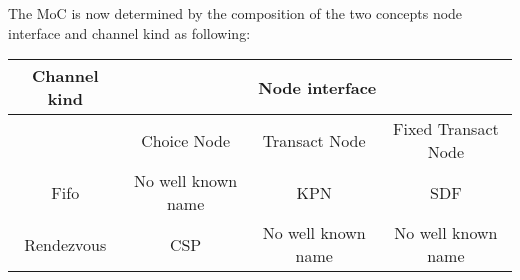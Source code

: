 The MoC is now determined by the composition of the two concepts node interface
and channel kind as following:

\begin{tabular}{|c||c|c|c|}
\hline
 Channel kind & \multicolumn{3}{c|}{ Node interface } \\
\hline
              & Choice Node         & Transact Node      & Fixed Transact Node \\
\hline \hline
 Fifo         & No well known name  & KPN                & SDF \\
\hline
 Rendezvous   & CSP                 & No well known name & No well known name \\
\hline
\end{tabular}


\clearpage
\appendix




